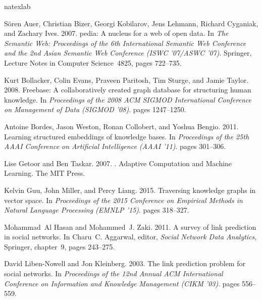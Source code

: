 \documentclass[11pt,a4paper]{article}
\begin{document}

\begin{thebibliography}{}
\expandafter\ifx\csname natexlab\endcsname\relax\def\natexlab#1{#1}\fi

S{\"o}ren Auer, Christian Bizer, Georgi Kobilarov, Jens Lehmann, Richard
  Cyganiak, and Zachary Ives. 2007.
pedia: A nucleus for a web of open data.
\newblock In {\em The Semantic Web: Proceedings of the 6th International
  Semantic Web Conference and the 2nd Asian Semantic Web Conference (ISWC
  '07/ASWC '07)\/}. Springer, Lecture Notes in Computer Science~4825, pages
  722--735.

Kurt Bollacker, Colin Evans, Praveen Paritosh, Tim Sturge, and Jamie Taylor.
  2008.
\newblock Freebase: A collaboratively created graph database for structuring
  human knowledge.
\newblock In {\em Proceedings of the 2008 ACM SIGMOD International Conference
  on Management of Data (SIGMOD '08)\/}. pages 1247--1250.

Antoine Bordes, Jason Weston, Ronan Collobert, and Yoshua Bengio. 2011.
\newblock Learning structured embeddings of knowledge bases.
\newblock In {\em Proceedings of the 25th AAAI Conference on Artificial
  Intelligence (AAAI '11)\/}. pages 301--306.

Lise Getoor and Ben Taskar. 2007.
.
\newblock Adaptive Computation and Machine Learning. The MIT Press.

Kelvin Guu, John Miller, and Percy Liang. 2015.
\newblock Traversing knowledge graphs in vector space.
\newblock In {\em Proceedings of the 2015 Conference on Empirical Methods in
  Natural Language Processing (EMNLP '15)\/}. pages 318--327.

Mohammad~Al Hasan and Mohammed~J. Zaki. 2011.
\newblock A survey of link prediction in social networks.
\newblock In Charu~C. Aggarwal, editor, {\em Social Network Data Analytics\/},
  Springer, chapter~9, pages 243--275.

David Liben-Nowell and Jon Kleinberg. 2003.
\newblock The link prediction problem for social networks.
\newblock In {\em Proceedings of the 12nd Annual ACM International Conference
  on Information and Knowledge Management (CIKM '03)\/}. pages 556--559.


\end{thebibliography}
\end{document}
